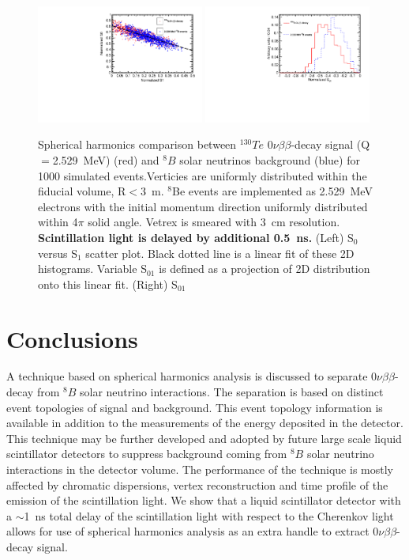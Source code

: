 \documentclass[12pt,twoside,letterpaper]{article}
\newcommand{\vbb}{0\nu\beta\beta}
\newcommand{\Te}{^{130}Te}
\newcommand{\B}{^{8}B}
\begin{document}
\begin{figure}[htb]
\centering
\includegraphics[angle=0,width=0.49\textwidth]{plots/hS0vsS1_Te130_1el_allLight_VtxSmear3cm_VtxShiftX0cm_momDT1p0ns_sci0p5ns_rndVtx_3p0mSphere.pdf}
\includegraphics[angle=0,width=0.49\textwidth]{plots/hS01_allLight_VtxSmear3cm_VtxShiftX0cm_momDT1p0ns_sci0p5ns_rndVtx_3p0mSphere.pdf}
\caption{Spherical harmonics comparison between $\Te$ $\vbb$-decay signal (Q$=$2.529~MeV) (red) and $\B$ solar neutrinos background (blue) for 1000 simulated events.Verticies are uniformly distributed within the fiducial volume, R$<$3~m. $^8$Be events are implemented as 2.529~MeV electrons with the initial momentum direction uniformly distributed within 4$\pi$ solid angle. Vetrex is smeared with 3~cm resolution. {\bf Scintillation light is delayed by additional 0.5~ns.} (Left) S$_0$ versus S$_1$ scatter plot. Black dotted line is a linear fit of these 2D histograms. Variable S$_{01}$ is defined as a projection of 2D distribution onto this linear fit. (Right) S$_{01}$}
\label{fig:SL_Te_SmearX3cm_momDT1ns_sci0p5ns_rndVtx_3p0m}
\end{figure}


\section{Conclusions}
A technique based on spherical harmonics analysis is discussed to separate $\vbb$-decay from $\B$ solar neutrino interactions. The separation is based on distinct event topologies of signal and background. This event topology information is available in addition to the measurements of the energy deposited in the detector. This technique may be further developed and adopted by future large scale liquid scintillator detectors to suppress background coming from $\B$ solar neutrino interactions in the detector volume. The performance of the technique is mostly affected by chromatic dispersions, vertex reconstruction and time profile of the emission of the scintillation light. We show that a liquid scintillator detector with a $\sim$1~ns total delay of the scintillation light with respect to the Cherenkov light allows for use of spherical harmonics analysis as an extra handle to extract $\vbb$-decay signal.
\end{document}
